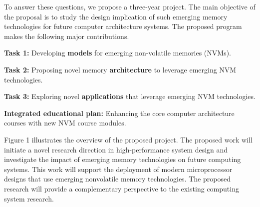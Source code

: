     To answer these questions, we propose a three-year project. The main objective of the proposal is to study the design implication of such emerging memory technologies for future computer architecture systems. The proposed program makes the
following major contributions.


\squishlist
\item {\textbf{Task 1:} Developing \textbf{models} for emerging non-volatile memories (NVMs).}
\item {\textbf{Task 2:} Proposing novel memory \textbf{architecture} to leverage emerging NVM technologies.}
\item {\textbf{Task 3:} Exploring novel \textbf{applications} that leverage  emerging NVM technologies.}
\item {\textbf{Integrated educational plan:} Enhancing the core computer architecture courses with new NVM course modules.}
\squishend

Figure 1 illustrates the overview of the proposed project. The proposed work will initiate a novel research direction in high-performance system design and investigate the impact of emerging memory technologies on future computing systems. This work will support the deployment of modern microprocessor designs that use  emerging nonvolatile memory technologies. The proposed research will provide a complementary perspective to the existing computing system research. 